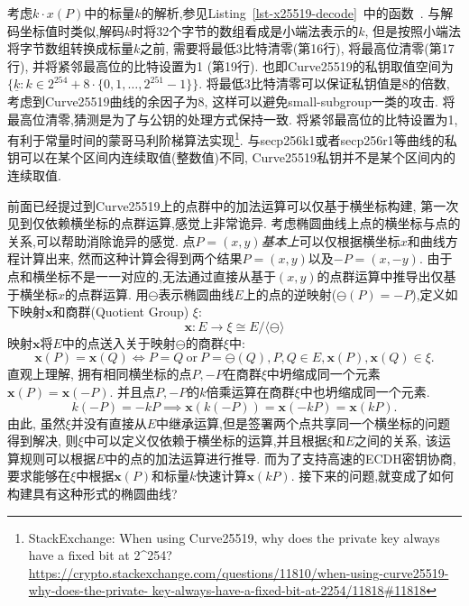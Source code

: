 考虑$k\cdot x(P)$中的标量$k$的解析,参见Listing~\ref{lst-x25519-decode}~中的函数~.
与解码坐标值时类似,解码$k$时将32个字节的数组看成是小端法表示的$k$,
但是按照小端法将字节数组转换成标量$k$之前,
需要将最低3比特清零(第16行), 将最高位清零(第17行), 并将紧邻最高位的比特设置为1 (第19行).
也即Curve25519的私钥取值空间为$\{\underline{k}: k\in 2^{254} + 8\cdot\{0,1,\ldots,2^{251}-1\}\}$.
将最低3比特清零可以保证私钥值是8的倍数,考虑到Curve25519曲线的余因子为8,
这样可以避免small-subgroup一类的攻击.
将最高位清零,猜测是为了与公钥的处理方式保持一致.
将紧邻最高位的比特设置为1,有利于常量时间的蒙哥马利阶梯算法实现\footnote{
StackExchange: When using Curve25519, why does the private key always have a fixed bit at 2\^{}254?
\url{https://crypto.stackexchange.com/questions/11810/when-using-curve25519-why-does-the-private-
key-always-have-a-fixed-bit-at-2254/11818\#11818}}.
与secp256k1或者secp256r1等曲线的私钥可以在某个区间内连续取值(整数值)不同,
Curve25519私钥并不是某个区间内的连续取值.

前面已经提过到Curve25519上的点群中的加法运算可以仅基于横坐标构建,
第一次见到仅依赖横坐标的点群运算,感觉上非常诡异.
考虑椭圆曲线上点的横坐标与点的关系,可以帮助消除诡异的感觉.
点$P=(x,y)$\textit{基本上}可以仅根据横坐标$x$和曲线方程计算出来,
然而这种计算会得到两个结果$P=(x,y)$以及$-P = (x, -y)$.
由于点和横坐标不是一一对应的,无法通过直接从基于$(x,y)$的点群运算中推导出仅基于横坐标$x$的点群运算.
用$\ominus$表示椭圆曲线$E$上的点的逆映射($\ominus(P) = -P$),定义如下映射$\mathbf{x}$和商群(Quotient Group) $\xi$:
$$\mathbf{x}: E \rightarrow\xi \cong E/\langle\ominus\rangle$$
映射$\mathbf{x}$将$E$中的点送入关于映射$\ominus$的商群$\xi$中:
$$\mathbf{x}(P) = \mathbf{x}(Q) \iff P = Q\ \text{or}\ P = \ominus(Q), P, Q \in E, \mathbf{x}(P), \mathbf{x}(Q) \in \xi.$$
直观上理解, 拥有相同横坐标的点$P, -P$在商群$\xi$中坍缩成同一个元素$\mathbf{x}(P)=\mathbf{x}(-P)$.
并且点$P, -P$的$k$倍乘运算在商群$\xi$中也坍缩成同一个元素.
$$k(-P) = -kP \implies \mathbf{x}(k(-P)) = \mathbf{x}(-kP)= \mathbf{x}(kP).$$
由此, 虽然$\xi$并没有直接从$E$中继承运算,但是签署两个点共享同一个横坐标的问题得到解决,
则$\xi$中可以定义仅依赖于横坐标的运算,并且根据$\xi$和$E$之间的关系,
该运算规则可以根据$E$中的点的加法运算进行推导.
而为了支持高速的ECDH密钥协商,要求能够在$\xi$中根据$\mathbf{x}(P)$和标量$k$快速计算$\mathbf{x}(kP)$.
接下来的问题,就变成了如何构建具有这种形式的椭圆曲线?

